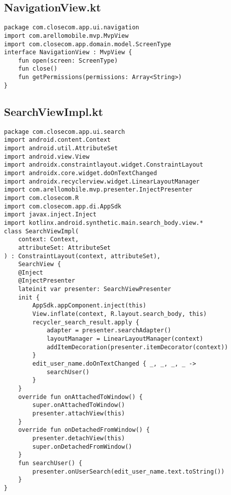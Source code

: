 \documentclass[listing]{espd}
\begin{document}
\subsection{NavigationView.kt}
\begin{verbatim}
package com.closecom.app.ui.navigation
import com.arellomobile.mvp.MvpView
import com.closecom.app.domain.model.ScreenType
interface NavigationView : MvpView {
    fun open(screen: ScreenType)
    fun close()
    fun getPermissions(permissions: Array<String>)
}
\end{verbatim}

\subsection{SearchViewImpl.kt}
\begin{verbatim}
package com.closecom.app.ui.search
import android.content.Context
import android.util.AttributeSet
import android.view.View
import androidx.constraintlayout.widget.ConstraintLayout
import androidx.core.widget.doOnTextChanged
import androidx.recyclerview.widget.LinearLayoutManager
import com.arellomobile.mvp.presenter.InjectPresenter
import com.closecom.R
import com.closecom.app.di.AppSdk
import javax.inject.Inject
import kotlinx.android.synthetic.main.search_body.view.*
class SearchViewImpl(
    context: Context,
    attributeSet: AttributeSet
) : ConstraintLayout(context, attributeSet),
    SearchView {
    @Inject
    @InjectPresenter
    lateinit var presenter: SearchViewPresenter
    init {
        AppSdk.appComponent.inject(this)
        View.inflate(context, R.layout.search_body, this)
        recycler_search_result.apply {
            adapter = presenter.searchAdapter()
            layoutManager = LinearLayoutManager(context)
            addItemDecoration(presenter.itemDecorator(context))
        }
        edit_user_name.doOnTextChanged { _, _, _, _ ->
            searchUser()
        }
    }
    override fun onAttachedToWindow() {
        super.onAttachedToWindow()
        presenter.attachView(this)
    }
    override fun onDetachedFromWindow() {
        presenter.detachView(this)
        super.onDetachedFromWindow()
    }
    fun searchUser() {
        presenter.onUserSearch(edit_user_name.text.toString())
    }
}
\end{verbatim}
\end{document}
